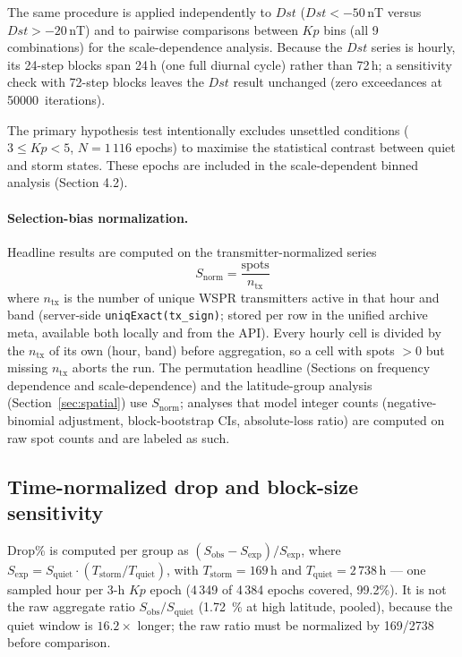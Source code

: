 \documentclass{agujournal2019}
\begin{document}
The same procedure is applied independently to $Dst$ ($Dst < -50$\,nT versus
$Dst > -20$\,nT) and to pairwise comparisons between $Kp$ bins (all 9
combinations) for the scale-dependence analysis. Because the $Dst$ series
is hourly, its 24-step blocks span 24\,h (one full diurnal cycle) rather
than 72\,h; a sensitivity check with 72-step blocks leaves the $Dst$
result unchanged (zero exceedances at \SI{50000}{iterations}).

The primary hypothesis test intentionally excludes unsettled conditions
($3 \leq Kp < 5$, $N = 1\,116$ epochs) to maximise the statistical
contrast between quiet and storm states. These epochs are included in
the scale-dependent binned analysis (Section 4.2).

\paragraph{Selection-bias normalization.} Headline results are
computed on the transmitter-normalized series
\begin{equation}
	S_{\mathrm{norm}} = \frac{\mathrm{spots}}{n_{\mathrm{tx}}}
	\label{eq:normtx}
\end{equation}
where $n_{\mathrm{tx}}$ is the number of unique WSPR transmitters
active in that hour and band (server-side
\texttt{uniqExact(tx\_sign)}; stored per row in the unified archive
meta, available both locally and from the API). Every hourly cell
is divided by the $n_{\mathrm{tx}}$ of its own (hour, band) before
aggregation, so a cell with spots $>0$ but missing $n_{\mathrm{tx}}$
aborts the run. The permutation headline (Sections on frequency
dependence and scale-dependence) and the latitude-group analysis
(Section~\ref{sec:spatial}) use $S_{\mathrm{norm}}$; analyses that
model integer counts (negative-binomial adjustment, block-bootstrap
CIs, absolute-loss ratio) are computed on raw spot counts and are
labeled as such.

\subsection{Time-normalized drop and block-size sensitivity}
\label{sec:dropnorm}

Drop\% is computed per group as
$(S_{\text{obs}} - S_{\text{exp}}) / S_{\text{exp}}$, where
$S_{\text{exp}} = S_{\text{quiet}} \cdot (T_{\text{storm}} /
T_{\text{quiet}})$, with $T_{\text{storm}} = 169$\,h and
$T_{\text{quiet}} = 2\,738$\,h --- one sampled hour per 3-h $Kp$ epoch
(4\,349 of 4\,384 epochs covered, 99.2\%). It is not the raw aggregate
ratio $S_{\text{obs}} / S_{\text{quiet}}$ (\SI{1.72}{\percent} at
high latitude, pooled), because the quiet window is $16.2\times$ longer;
the raw ratio must be normalized by 169/2738 before comparison.
\end{document}
